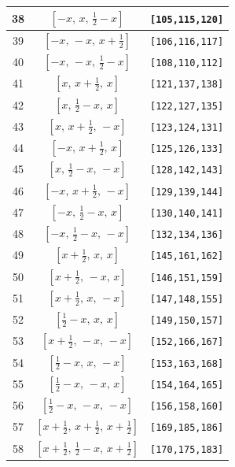 \documentclass[fleqn,8pt]{jsarticle}
\begin{document}
\begin{longtable}{ccc}
38 & $\left[ - x,\, x,\, \frac{1}{2} - x \right]$ & {\tt [105,115,120]} \\ \hline
39 & $\left[ - x,\, - x,\, x + \frac{1}{2} \right]$ & {\tt [106,116,117]} \\ \hline
40 & $\left[ - x,\, - x,\, \frac{1}{2} - x \right]$ & {\tt [108,110,112]} \\ \hline
41 & $\left[ x,\, x + \frac{1}{2},\, x \right]$ & {\tt [121,137,138]} \\ \hline
42 & $\left[ x,\, \frac{1}{2} - x,\, x \right]$ & {\tt [122,127,135]} \\ \hline
43 & $\left[ x,\, x + \frac{1}{2},\, - x \right]$ & {\tt [123,124,131]} \\ \hline
44 & $\left[ - x,\, x + \frac{1}{2},\, x \right]$ & {\tt [125,126,133]} \\ \hline
45 & $\left[ x,\, \frac{1}{2} - x,\, - x \right]$ & {\tt [128,142,143]} \\ \hline
46 & $\left[ - x,\, x + \frac{1}{2},\, - x \right]$ & {\tt [129,139,144]} \\ \hline
47 & $\left[ - x,\, \frac{1}{2} - x,\, x \right]$ & {\tt [130,140,141]} \\ \hline
48 & $\left[ - x,\, \frac{1}{2} - x,\, - x \right]$ & {\tt [132,134,136]} \\ \hline
49 & $\left[ x + \frac{1}{2},\, x,\, x \right]$ & {\tt [145,161,162]} \\ \hline
50 & $\left[ x + \frac{1}{2},\, - x,\, x \right]$ & {\tt [146,151,159]} \\ \hline
51 & $\left[ x + \frac{1}{2},\, x,\, - x \right]$ & {\tt [147,148,155]} \\ \hline
52 & $\left[ \frac{1}{2} - x,\, x,\, x \right]$ & {\tt [149,150,157]} \\ \hline
53 & $\left[ x + \frac{1}{2},\, - x,\, - x \right]$ & {\tt [152,166,167]} \\ \hline
54 & $\left[ \frac{1}{2} - x,\, x,\, - x \right]$ & {\tt [153,163,168]} \\ \hline
55 & $\left[ \frac{1}{2} - x,\, - x,\, x \right]$ & {\tt [154,164,165]} \\ \hline
56 & $\left[ \frac{1}{2} - x,\, - x,\, - x \right]$ & {\tt [156,158,160]} \\ \hline
57 & $\left[ x + \frac{1}{2},\, x + \frac{1}{2},\, x + \frac{1}{2} \right]$ & {\tt [169,185,186]} \\ \hline
58 & $\left[ x + \frac{1}{2},\, \frac{1}{2} - x,\, x + \frac{1}{2} \right]$ & {\tt [170,175,183]} \\ \hline

\end{longtable}
\end{document}
